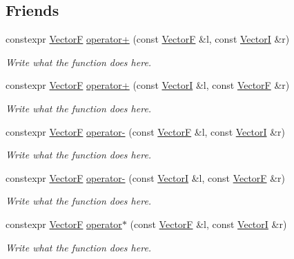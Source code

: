 \subsection*{Friends}
\begin{DoxyCompactItemize}
\item 
constexpr \hyperlink{structVectorF}{Vector\+F} \hyperlink{structVectorF_afa7c5f6c679bed0b801851befd794cb3}{operator+} (const \hyperlink{structVectorF}{Vector\+F} \&l, const \hyperlink{structVectorI}{Vector\+I} \&r)
\begin{DoxyCompactList}\small\item\em Write what the function does here. \end{DoxyCompactList}\item 
constexpr \hyperlink{structVectorF}{Vector\+F} \hyperlink{structVectorF_a1ce8a094648909e1206ed883059066eb}{operator+} (const \hyperlink{structVectorI}{Vector\+I} \&l, const \hyperlink{structVectorF}{Vector\+F} \&r)
\begin{DoxyCompactList}\small\item\em Write what the function does here. \end{DoxyCompactList}\item 
constexpr \hyperlink{structVectorF}{Vector\+F} \hyperlink{structVectorF_a8c841e23f2dce6697b7fb4df0d9112e8}{operator-\/} (const \hyperlink{structVectorF}{Vector\+F} \&l, const \hyperlink{structVectorI}{Vector\+I} \&r)
\begin{DoxyCompactList}\small\item\em Write what the function does here. \end{DoxyCompactList}\item 
constexpr \hyperlink{structVectorF}{Vector\+F} \hyperlink{structVectorF_aea94c6c9a31ed136700a8109b6bc3f00}{operator-\/} (const \hyperlink{structVectorI}{Vector\+I} \&l, const \hyperlink{structVectorF}{Vector\+F} \&r)
\begin{DoxyCompactList}\small\item\em Write what the function does here. \end{DoxyCompactList}\item 
constexpr \hyperlink{structVectorF}{Vector\+F} \hyperlink{structVectorF_a382c0752fd454c1cd3a1769a711fc092}{operator$\ast$} (const \hyperlink{structVectorF}{Vector\+F} \&l, const \hyperlink{structVectorI}{Vector\+I} \&r)
\begin{DoxyCompactList}\small\item\em Write what the function does here. \end{DoxyCompactList}\item 

\end{DoxyCompactItemize}
